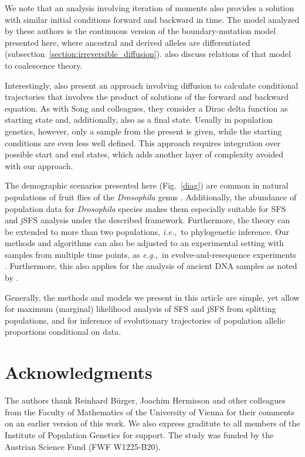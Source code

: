 \documentclass[preprint]{elsarticle}
\newcommand\eg{{\it e.g.,}}
\newcommand\ie{{\it i.e.,}}
\begin{document}
{We note that an analysis involving iteration of moments \citep{Evan07,Zivk11} also provides a solution with similar initial conditions forward and backward in time. The model analyzed by these authors is the continuous version of the  boundary-mutation model presented here, where ancestral and derived alleles are differentiated (subsection~\ref{section:irreversible_diffusion}). \citet{Zivk11} also discuss relations of that model to coalescence theory. 

Interestingly, \citet{Zhao13} also present an approach involving diffusion to calculate conditional trajectories that involves the product of solutions of the forward and backward equation. As with Song and colleagues, they consider a Dirac delta function as starting state and, additionally, also as a final state. Usually in population genetics, however, only a sample from the present is given, while the starting conditions are even less well defined. This approach requires integration over possible start and end states, which adds another layer of complexity avoided with our approach. 

The demographic scenarios presented here (Fig.~\ref{diag}) are common in natural populations of fruit flies of the \textit{Drosophila} genus \citep[\eg][]{Li06,Zeng10a,Pool12}. Additionally, the abundance of population data for \textit{Drosophila} species makes them especially suitable for SFS and jSFS analysis under the described framework. Furthermore, the theory can be extended to more than two populations, \ie\ to phylogenetic inference. Our methods and algorithms can also be adjusted to an experimental setting with samples from multiple time points, as \eg\ in evolve-and-resequence experiments \citep{Kofl14}. Furthermore, this also applies for the analysis of ancient DNA samples as noted by \citet{Stei14}.

Generally, the methods and models we present in this article are simple, yet allow for maximum (marginal) likelihood analysis of SFS and jSFS from splitting populations, and for inference of evolutionary trajectories of population allelic proportions conditional on data. 

\section*{Acknowledgments}

The authors thank Reinhard B\"urger, Joachim Hermisson and other colleagues from the Faculty of Mathematics of the University of Vienna for their comments on an earlier version of this work. We also express graditute to all members of the Institute of Population Genetics for support. The study was funded by the Austrian Science Fund (FWF W1225-B20). %

}
\end{document}
